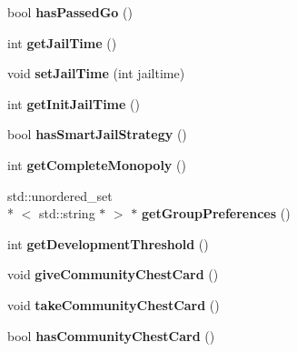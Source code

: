 \begin{DoxyCompactItemize}
\item 
\hypertarget{classPlayer_aaf75a0c0ef84372270b415a230968551}{bool {\bfseries has\-Passed\-Go} ()}\label{classPlayer_aaf75a0c0ef84372270b415a230968551}

\item 
\hypertarget{classPlayer_afe569ab2a46ce84ed6c7819775a0e2e3}{int {\bfseries get\-Jail\-Time} ()}\label{classPlayer_afe569ab2a46ce84ed6c7819775a0e2e3}

\item 
\hypertarget{classPlayer_a2f79f97dd5116e4c87141efc7cc86dda}{void {\bfseries set\-Jail\-Time} (int jailtime)}\label{classPlayer_a2f79f97dd5116e4c87141efc7cc86dda}

\item 
\hypertarget{classPlayer_a6aee197e6087ea1e6604fc2a086c5f1d}{int {\bfseries get\-Init\-Jail\-Time} ()}\label{classPlayer_a6aee197e6087ea1e6604fc2a086c5f1d}

\item 
\hypertarget{classPlayer_a504684baea48fe8f275c8a5df6cdf18a}{bool {\bfseries has\-Smart\-Jail\-Strategy} ()}\label{classPlayer_a504684baea48fe8f275c8a5df6cdf18a}

\item 
\hypertarget{classPlayer_a05a8a2a57eb2f6bce4a8a6a5dd83eabb}{int {\bfseries get\-Complete\-Monopoly} ()}\label{classPlayer_a05a8a2a57eb2f6bce4a8a6a5dd83eabb}

\item 
\hypertarget{classPlayer_a4c224c8b671457de3b13a9e4a8453692}{std\-::unordered\-\_\-set\\*
$<$ std\-::string $\ast$ $>$ $\ast$ {\bfseries get\-Group\-Preferences} ()}\label{classPlayer_a4c224c8b671457de3b13a9e4a8453692}

\item 
\hypertarget{classPlayer_a16a719baeddad5a35571e3c679731140}{int {\bfseries get\-Development\-Threshold} ()}\label{classPlayer_a16a719baeddad5a35571e3c679731140}

\item 
\hypertarget{classPlayer_a8b01831d9342cf5cb7430994501b2967}{void {\bfseries give\-Community\-Chest\-Card} ()}\label{classPlayer_a8b01831d9342cf5cb7430994501b2967}

\item 
\hypertarget{classPlayer_a4c6f7059eaadfa380443088cfd0bc277}{void {\bfseries take\-Community\-Chest\-Card} ()}\label{classPlayer_a4c6f7059eaadfa380443088cfd0bc277}

\item 
\hypertarget{classPlayer_a022759d78704aeed1104b4de9b70a632}{bool {\bfseries has\-Community\-Chest\-Card} ()}\label{classPlayer_a022759d78704aeed1104b4de9b70a632}


\end{DoxyCompactItemize}
